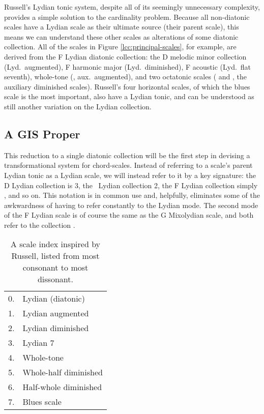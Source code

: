 Russell's Lydian tonic system, despite all of its seemingly unnecessary
complexity, provides a simple solution to the cardinality problem. Because
all non-diatonic scales have a Lydian scale as their ultimate source (their
parent scale), this means we can understand these other scales as alterations
of some diatonic collection. All of the scales in Figure
\ref{lcc:principal-scales}, for example,
are derived from the F Lydian diatonic collection: the D melodic minor
collection (Lyd.\ augmented), F harmonic major (Lyd.\ diminished), F acoustic
(Lyd.\ flat seventh), whole-tone (, aux.\ augmented), and
two octatonic scales ( and , the
auxiliary diminished scales). Russell's four horizontal scales, of which the
blues scale is the most important, also have a Lydian tonic, and can be
understood as still another variation on the Lydian collection.

\subsection{A GIS Proper}
\label{subsec:chord-scale-gis}

This reduction to a single diatonic collection will be the first step in
devising a transformational system for chord-scales. Instead of referring to a
scale's parent Lydian tonic as a Lydian scale, we will instead refer to it by
a key signature: the D Lydian collection is 3\sharp, the \Eflat\
Lydian collection 2\flat, the F Lydian collection simply \nat, and so on.
This notation is in common use and, helpfully, eliminates some of the
awkwardness of having to refer constantly to the Lydian mode. The second mode
of the F Lydian scale is of course the same as the G Mixolydian scale, and
both refer to the collection \nat.

\begin{table}[tbp]
  \centering
  \begin{tabular}{rl}
    0. & Lydian (diatonic) \\
    1. & Lydian augmented \\
    2. & Lydian diminished \\
    3. & Lydian \flat{}7 \\
    4. & Whole-tone \\
    5. & Whole-half diminished \\
    6. & Half-whole diminished \\
    7. & Blues scale
  \end{tabular}
  \caption{A scale index inspired by Russell, listed from most consonant to
    most dissonant.}
  \label{cst:scale-index}
\end{table}

